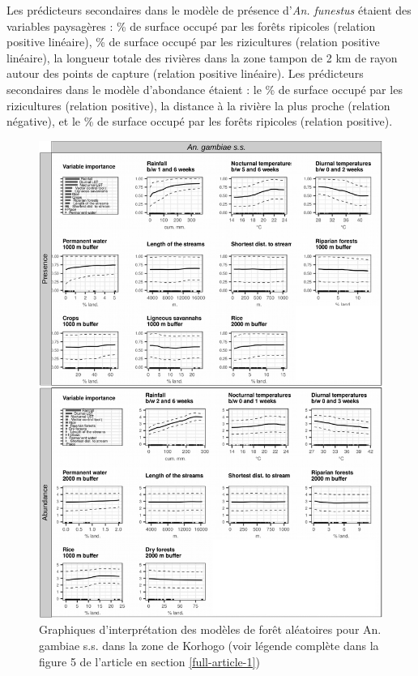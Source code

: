 \documentclass[12pt,twoside]{reedthesis}
\begin{document}
Les prédicteurs secondaires dans le modèle de présence d'\emph{An. funestus} étaient des variables paysagères : \% de surface occupé par les forêts ripicoles (relation positive linéaire), \% de surface occupé par les rizicultures (relation positive linéaire), la longueur totale des rivières dans la zone tampon de 2 km de rayon autour des points de capture (relation positive linéaire). Les prédicteurs secondaires dans le modèle d'abondance étaient : le \% de surface occupé par les rizicultures (relation positive), la distance à la rivière la plus proche (relation négative), et le \% de surface occupé par les forêts ripicoles (relation positive).\\
\begin{figure}

{\centering \includegraphics[width=1\linewidth]{figure/pdp_gambiaess_ci} 

}

\caption[Graphiques d'interprétation des modèles de forêt aléatoires pour An. gambiae s.s. dans la zone de Korhogo]{Graphiques d'interprétation des modèles de forêt aléatoires pour An. gambiae s.s. dans la zone de Korhogo (voir légende complète dans la figure 5 de l'article en section \ref{full-article-1})}\label{fig:pdp-ci-gambiae}
\end{figure}
\end{document}
